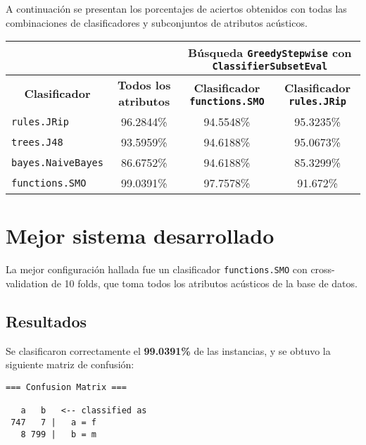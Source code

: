 \documentclass[10pt,a4paper]{article}
\begin{document}
A continuación se presentan los porcentajes de aciertos obtenidos con todas las combinaciones de clasificadores y subconjuntos de atributos acústicos.

\begin{table}[h]
  \centering
  \begin{tabular}{  l  c | c | c | }
    \cline{3-4}
    & & \multicolumn{2}{|c|}{\textbf{Búsqueda \texttt{GreedyStepwise} con \texttt{ClassifierSubsetEval}}}  \\
    \hline                        
    \multicolumn{1}{|c|}{\textbf{Clasificador}} & \textbf{Todos los atributos} & \textbf{Clasificador \texttt{functions.SMO}} & \textbf{Clasificador \texttt{rules.JRip}} \\
    \hline
    \multicolumn{1}{|l|}{\texttt{rules.JRip}}       & 96.2844\% & 94.5548\% & 95.3235\% \\
    \hline
    \multicolumn{1}{|l|}{\texttt{trees.J48}}        & 93.5959\% & 94.6188\% & 95.0673\% \\
    \hline
    \multicolumn{1}{|l|}{\texttt{bayes.NaiveBayes}} & 86.6752\% & 94.6188\% & 85.3299\% \\
    \hline
    \multicolumn{1}{|l|}{\texttt{functions.SMO}}    & 99.0391\% & 97.7578\% & 91.672\% \\
    \hline  
  \end{tabular}
\end{table}

\section{Mejor sistema desarrollado}

La mejor configuración hallada fue un clasificador \texttt{functions.SMO} con cross-validation de 10 folds, que toma todos los atributos acústicos de la base de datos.

\subsection{Resultados}

Se clasificaron correctamente el \textbf{99.0391\%} de las instancias, y se obtuvo la siguiente matriz de confusión:

\begin{verbatim}
=== Confusion Matrix ===

   a   b   <-- classified as
 747   7 |   a = f
   8 799 |   b = m
\end{verbatim}
\end{document}
